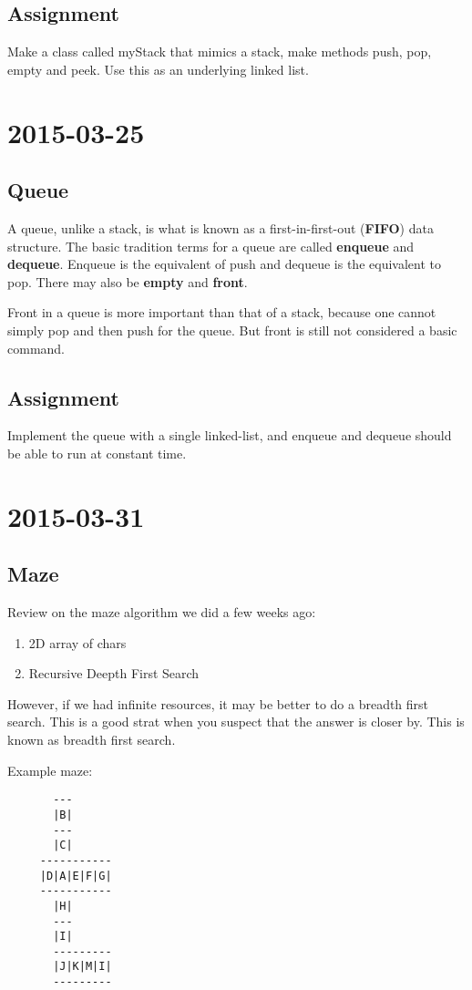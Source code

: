\documentclass [12 pt, twoside] {article}
\begin{document}
\subsection{Assignment}
Make a class called myStack that mimics a stack, make methods push, pop, empty
and peek. Use this as an underlying linked list.

\section{2015-03-25}
\subsection{Queue}
A queue, unlike a stack, is what is known as a first-in-first-out
(\textbf{FIFO}) data structure. The basic tradition terms for a queue are called
\textbf{enqueue} and \textbf{dequeue}. Enqueue is the equivalent of push and
dequeue is the equivalent to pop. There may also be \textbf{empty} and
\textbf{front}.

Front in a queue is more important than that of a stack, because one cannot
simply pop and then push for the queue. But front is still not considered a
basic command.

\subsection{Assignment}
Implement the queue with a single linked-list, and enqueue and dequeue should be
able to run at constant time.

\section{2015-03-31}
\subsection{Maze}
Review on the maze algorithm we did a few weeks ago:
\begin{enumerate}
    \item 2D array of chars
    \item Recursive Deepth First Search
\end{enumerate}


However, if we had infinite resources, it may be better to do a breadth first
search. This is a good strat when you suspect that the answer is closer by. This
is  known as breadth first search.


Example maze:
\begin{lstlisting}
       ---
       |B|
       ---
       |C|
     -----------
     |D|A|E|F|G|
     -----------
       |H|
       ---
       |I|
       ---------
       |J|K|M|I|
       ---------
\end{lstlisting}
\end{document}
